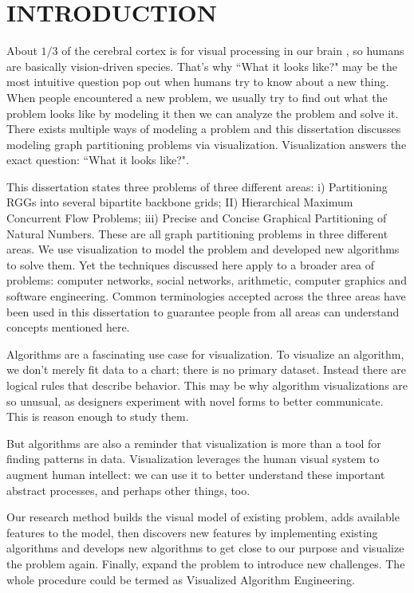 \chapter{INTRODUCTION} \label{ch:introduction}%

About $1/3$ of the cerebral cortex is for visual processing in our brain \cite{grady1993vision}, so humans are basically vision-driven species.  That's why ``What it looks like?" may be the most intuitive question pop out when humans try to know about a new thing. When people encountered a new problem, we usually try to find out what the problem looks like by modeling it then we can analyze the problem and solve it. There exists multiple ways of modeling a problem and this dissertation discusses modeling graph partitioning problems via visualization. Visualization answers the exact question: ``What it looks like?".

This dissertation states three problems of three different areas: i) Partitioning \acp{RGG} into several bipartite backbone grids; II) Hierarchical Maximum Concurrent Flow Problems; iii) Precise and Concise Graphical Partitioning of Natural Numbers. These are all graph partitioning problems in three different areas. We use visualization to model the problem and developed new algorithms to solve them. Yet the techniques discussed here apply to a broader area of problems: computer networks, social networks, arithmetic, computer graphics and software engineering. Common terminologies accepted across the three areas have been used in this dissertation to guarantee people from all areas can understand concepts mentioned here.

Algorithms are a fascinating use case for visualization. To visualize an algorithm, we don’t merely fit data to a chart; there is no primary dataset. Instead there are logical rules that describe behavior. This may be why algorithm visualizations are so unusual, as designers experiment with novel forms to better communicate. This is reason enough to study them.

But algorithms are also a reminder that visualization is more than a tool for finding patterns in data. Visualization leverages the human visual system to augment human intellect: we can use it to better understand these important abstract processes, and perhaps other things, too.

Our research method builds the visual model of existing problem, adds available features to the model, then discovers new features by implementing existing algorithms and develops new algorithms to get close to our purpose and visualize the problem again. Finally, expand the problem to introduce new challenges. The whole procedure could be termed as Visualized Algorithm Engineering.